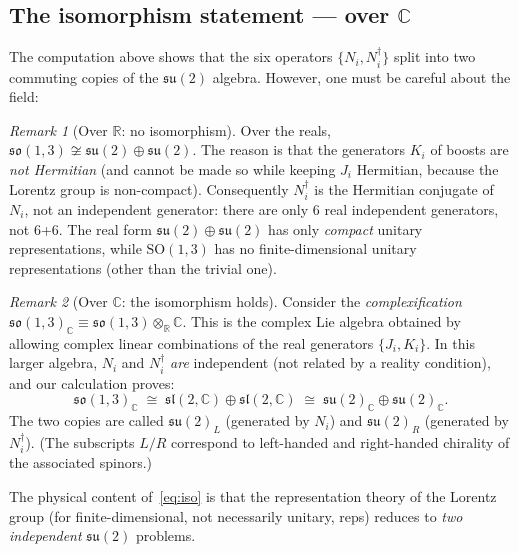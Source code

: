 \documentclass[12pt]{article}
\theoremstyle{remark}
\newtheorem*{remark}{Remark}
\begin{document}
\subsection{The isomorphism statement --- over \texorpdfstring{$\mathbb{C}$}{C}}

The computation above shows that the six operators
$\{N_i, N_i^\dagger\}$ split into two commuting copies of the
$\mathfrak{su}(2)$ algebra.  However, one must be careful about the field:

\begin{remark}[Over $\mathbb{R}$: no isomorphism]
  Over the reals, $\mathfrak{so}(1,3) \not\cong \mathfrak{su}(2)\oplus\mathfrak{su}(2)$.
  The reason is that the generators $K_i$ of boosts are \emph{not Hermitian}
  (and cannot be made so while keeping $J_i$ Hermitian, because the Lorentz
  group is non-compact).  Consequently $N_i^\dagger$ is the Hermitian
  conjugate of $N_i$, not an independent generator: there are only 6
  real independent generators, not 6+6.
  The real form $\mathfrak{su}(2)\oplus\mathfrak{su}(2)$ has only
  \emph{compact} unitary representations, while $\mathrm{SO}(1,3)$ has
  no finite-dimensional unitary representations (other than the trivial one).
\end{remark}

\begin{remark}[Over $\mathbb{C}$: the isomorphism holds]
  Consider the \emph{complexification}
  $\mathfrak{so}(1,3)_\mathbb{C} \equiv \mathfrak{so}(1,3)\otimes_\mathbb{R}\mathbb{C}$.
  This is the complex Lie algebra obtained by allowing complex linear combinations
  of the real generators $\{J_i, K_i\}$.  In this larger algebra, $N_i$ and
  $N_i^\dagger$ \emph{are} independent (not related by a reality condition),
  and our calculation proves:
  \begin{equation}
    \mathfrak{so}(1,3)_\mathbb{C}
    \;\cong\;
    \mathfrak{sl}(2,\mathbb{C}) \oplus \mathfrak{sl}(2,\mathbb{C})
    \;\cong\;
    \mathfrak{su}(2)_\mathbb{C} \oplus \mathfrak{su}(2)_\mathbb{C}.
    \label{eq:iso}
  \end{equation}
  The two copies are called $\mathfrak{su}(2)_L$ (generated by $N_i$) and
  $\mathfrak{su}(2)_R$ (generated by $N_i^\dagger$).
  (The subscripts $L/R$ correspond to left-handed and right-handed chirality
  of the associated spinors.)
\end{remark}

The physical content of~\eqref{eq:iso} is that the representation theory
of the Lorentz group (for finite-dimensional, not necessarily unitary, reps)
reduces to \emph{two independent} $\mathfrak{su}(2)$ problems.
\end{document}
